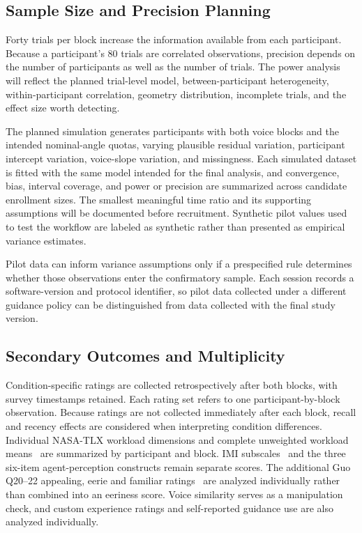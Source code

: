 \subsection{Sample Size and Precision Planning}
Forty trials per block increase the information available from each participant. Because a participant's 80 trials are correlated observations, precision depends on the number of participants as well as the number of trials. The power analysis will reflect the planned trial-level model, between-participant heterogeneity, within-participant correlation, geometry distribution, incomplete trials, and the effect size worth detecting.

The planned simulation generates participants with both voice blocks and the intended nominal-angle quotas, varying plausible residual variation, participant intercept variation, voice-slope variation, and missingness. Each simulated dataset is fitted with the same model intended for the final analysis, and convergence, bias, interval coverage, and power or precision are summarized across candidate enrollment sizes. The smallest meaningful time ratio and its supporting assumptions will be documented before recruitment. Synthetic pilot values used to test the workflow are labeled as synthetic rather than presented as empirical variance estimates.

Pilot data can inform variance assumptions only if a prespecified rule determines whether those observations enter the confirmatory sample. Each session records a software-version and protocol identifier, so pilot data collected under a different guidance policy can be distinguished from data collected with the final study version.

\subsection{Secondary Outcomes and Multiplicity}
Condition-specific ratings are collected retrospectively after both blocks, with survey timestamps retained. Each rating set refers to one participant-by-block observation. Because ratings are not collected immediately after each block, recall and recency effects are considered when interpreting condition differences. Individual NASA-TLX workload dimensions and complete unweighted workload means~\cite{hart1988nasatlx} are summarized by participant and block. IMI subscales~\cite{mcauley1989imi} and the three six-item agent-perception constructs remain separate scores. The additional Guo Q20--22 appealing, eerie and familiar ratings~\cite{guo2024doppelganger} are analyzed individually rather than combined into an eeriness score. Voice similarity serves as a manipulation check, and custom experience ratings and self-reported guidance use are also analyzed individually.

